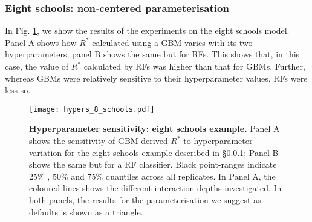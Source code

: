 \documentclass{article}
\begin{document}
\subsubsection{Eight schools: non-centered parameterisation}\label{sec:hyperparameters_8_schools}
In Fig. \ref{fig:hypers_8_schools}, we show the results of the experiments on the eight schools model. Panel A shows how $R^*$ calculated using a GBM varies with its two hyperparameters; panel B shows the same but for RFs. This shows that, in this case, the value of $R^*$ calculated by RFs was higher than that for GBMs. Further, whereas GBMs were relatively sensitive to their hyperparameter values, RFs were less so.

\begin{figure}[!htb]
	\centerline{\texttt{[image: hypers\_8\_schools.pdf]}}
	\caption{\textbf{Hyperparameter sensitivity: eight schools example.} Panel A shows the sensitivity of GBM-derived $R^*$ to hyperparameter variation for the eight schools example described in \S\ref{sec:hyperparameters_8_schools}; Panel B shows the same but for a RF classifier. Black point-ranges indicate 25\% , 50\% and 75\% quantiles across all replicates. In Panel A, the coloured lines shows the different interaction depths investigated. In both panels, the results for the parameterisation we suggest as defaults is shown as a triangle.}
	\label{fig:hypers_8_schools}
\end{figure}

\color{black}


 
\end{document}
